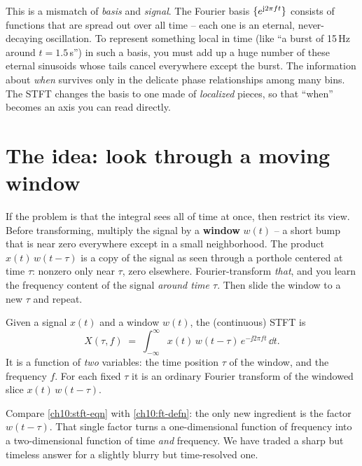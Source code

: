 \begin{happeningbox}
This is a mismatch of \emph{basis} and \emph{signal}. The
Fourier basis $\{e^{\mathrm{j} 2\pi f t}\}$ consists of functions that are spread out
over all time -- each one is an eternal, never-decaying oscillation. To represent
something local in time (like ``a burst of 15\,Hz around $t = 1.5$\,s'') in such
a basis, you must add up a huge number of these eternal sinusoids whose tails
cancel everywhere except the burst. The information about \emph{when} survives
only in the delicate phase relationships among many bins. The STFT changes the
basis to one made of \emph{localized} pieces, so that ``when'' becomes an axis you
can read directly.
\end{happeningbox}

\section{The idea: look through a moving window}
\label{ch10:moving-window}

If the problem is that the integral sees all
of time at once, then restrict its view. Before transforming, multiply the signal
by a \textbf{window} $w(t)$ -- a short bump that is near zero everywhere except in
a small neighborhood. The product $x(t)\,w(t - \tau)$ is a copy of the signal as
seen through a porthole centered at time $\tau$: nonzero only near $\tau$, zero
elsewhere. Fourier-transform \emph{that}, and you learn the frequency content of
the signal \emph{around time $\tau$}. Then slide the window to a new $\tau$ and
repeat.

\begin{definition}
\label{ch10:stft-defn}
Given a signal $x(t)$ and a window $w(t)$, the (continuous) STFT is
\begin{equation}
\label{ch10:stft-eqn}
X(\tau, f) \;=\; \int_{-\infty}^{\infty} x(t)\, w(t - \tau)\, e^{-\jj 2\pi f t}\,\dd t .
\end{equation}
It is a function of \emph{two} variables: the time position $\tau$ of the window,
and the frequency $f$. For each fixed $\tau$ it is an ordinary Fourier
transform of the windowed slice $x(t)\,w(t-\tau)$.
\end{definition}

Compare \eqref{ch10:stft-eqn} with \eqref{ch10:ft-defn}: the only new ingredient
is the factor $w(t-\tau)$. That single factor turns a one-dimensional function of
frequency into a two-dimensional function of time \emph{and} frequency. We have
traded a sharp but timeless answer for a slightly blurry but time-resolved one.

